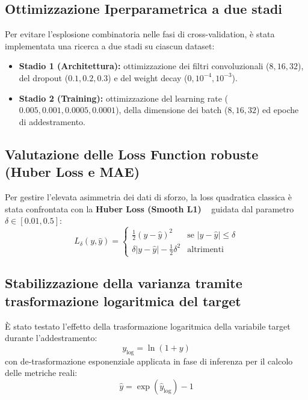 \documentclass[11pt, a4paper]{article}
\begin{document}
\subsection{Ottimizzazione Iperparametrica a due stadi}
Per evitare l'esplosione combinatoria nelle fasi di cross-validation, è stata
implementata una ricerca a due stadi su ciascun dataset:
\begin{itemize}
    \item \textbf{Stadio 1 (Architettura):} ottimizzazione dei filtri convoluzionali ($8, 16, 32$), del dropout ($0.1, 0.2, 0.3$) e del weight decay ($0, 10^{-4}, 10^{-3}$).
    \item \textbf{Stadio 2 (Training):} ottimizzazione del learning rate ($0.005, 0.001, 0.0005, 0.0001$), della dimensione dei batch ($8, 16, 32$) ed epoche di addestramento.
\end{itemize}

\subsection{Valutazione delle Loss Function robuste (Huber Loss e MAE)}
Per gestire l'elevata asimmetria dei dati di sforzo, la loss quadratica
classica è stata confrontata con la \textbf{Huber Loss (Smooth L1)}
~\cite{huber1964robust} guidata dal parametro $\delta \in [0.01, 0.5]$:
\begin{equation}
    L_\delta(y, \hat{y}) = \begin{cases}
        \frac{1}{2}{(y - \hat{y})}^2                 & \text{se } |y - \hat{y}| \le \delta \\
        \delta |y - \hat{y}| - \frac{1}{2}\delta^2 & \text{altrimenti}
    \end{cases}
\end{equation}

\subsection{Stabilizzazione della varianza tramite trasformazione logaritmica del target}
È stato testato l'effetto della trasformazione logaritmica della variabile target durante l'addestramento:
\begin{equation}
    y_{\text{log}} = \ln(1 + y)
\end{equation}
con de-trasformazione esponenziale applicata in fase di inferenza per il calcolo delle metriche reali:
\begin{equation}
    \hat{y} = \exp(\hat{y}_{\text{log}}) - 1
\end{equation}
\end{document}
